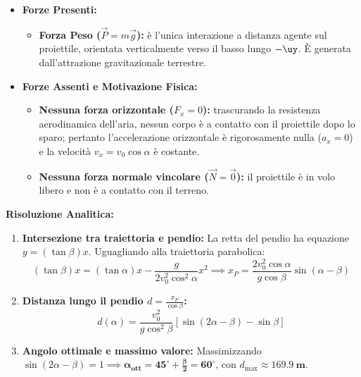 \begin{tcolorbox}[enhanced, breakable, colback=forestgreen!5!white, colframe=forestgreen!80!black,
    title={\textbf{Analisi delle Forze in Gioco (Free-Body Diagram in Volo)}}, fonttitle=\bfseries\sffamily]
\begin{itemize}
    \item \textbf{Forze Presenti:}
    \begin{itemize}
        \item \textbf{Forza Peso ($\vec{P} = m\vec{g}$):} è l'unica interazione a distanza agente sul proiettile, orientata verticalmente verso il basso lungo $-\uy$. È generata dall'attrazione gravitazionale terrestre.
    \end{itemize}
    \item \textbf{Forze Assenti e Motivazione Fisica:}
    \begin{itemize}
        \item \textbf{Nessuna forza orizzontale ($F_x = 0$):} trascurando la resistenza aerodinamica dell'aria, nessun corpo è a contatto con il proiettile dopo lo sparo; pertanto l'accelerazione orizzontale è rigorosamente nulla ($a_x = 0$) e la velocità $v_x = v_0\cos\alpha$ è costante.
        \item \textbf{Nessuna forza normale vincolare ($\vec{N} = \vec{0}$):} il proiettile è in volo libero e non è a contatto con il terreno.
    \end{itemize}
\end{itemize}
\end{tcolorbox}

\textbf{Risoluzione Analitica:}
\begin{enumerate}
    \item \textbf{Intersezione tra traiettoria e pendio:}
    La retta del pendio ha equazione $y = (\tan\beta) x$. Uguagliando alla traiettoria parabolica:
    \begin{equation}
        (\tan\beta) x = (\tan\alpha) x - \frac{g}{2 v_0^2 \cos^2\alpha} x^2 \implies x_P = \frac{2 v_0^2 \cos\alpha}{g \cos\beta} \sin(\alpha - \beta)
    \end{equation}
    \item \textbf{Distanza lungo il pendio $d = \frac{x_P}{\cos\beta}$:}
    \begin{equation}
        d(\alpha) = \frac{v_0^2}{g \cos^2\beta} \left[\sin(2\alpha - \beta) - \sin\beta\right]
    \end{equation}
    \item \textbf{Angolo ottimale e massimo valore:}
    Massimizzando $\sin(2\alpha - \beta) = 1 \implies \mathbf{\alpha_{\text{ott}} = 45^\circ + \frac{\beta}{2} = 60^\circ}$, con $d_{\max} \approx \mathbf{\SI{169.9}{\metre}}$.
\end{enumerate}

